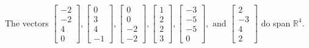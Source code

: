 \begin{exercise}
\begin{exerciseStatement}
  \end{exerciseStatement}
  \begin{exerciseAnswer}
   The vectors \(\left[\begin{array}{r}
-2 \\
-2 \\
4 \\
0
\end{array}\right] , \left[\begin{array}{r}
0 \\
3 \\
4 \\
-1
\end{array}\right] , \left[\begin{array}{r}
0 \\
0 \\
-2 \\
-2
\end{array}\right] , \left[\begin{array}{r}
1 \\
2 \\
2 \\
3
\end{array}\right] , \left[\begin{array}{r}
-3 \\
-5 \\
-5 \\
0
\end{array}\right] , \text{ and } \left[\begin{array}{r}
2 \\
-3 \\
4 \\
2
\end{array}\right]\) 
  	 do  
	span \(\mathbb{R}^4\).
  


  \end{exerciseAnswer}
\end{exercise}